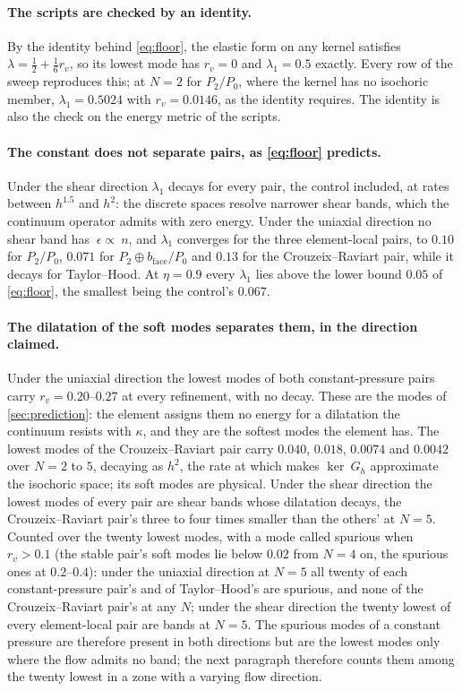 \documentclass{article}
\newcommand{\eps}{~\epsilon}
\theoremstyle{definition}
\theoremstyle{plain}
\begin{document}
\paragraph{The scripts are checked by an identity.} By the identity behind
\eqref{eq:floor}, the elastic form on any kernel satisfies
$\lambda = \tfrac12 + \tfrac16 r_v$, so its lowest mode has $r_v = 0$ and
$\lambda_1 = 0.5$ exactly. Every row of the sweep reproduces this; at $N = 2$
for $P_2/P_0$, where the kernel has no isochoric member, $\lambda_1 = 0.5024$
with $r_v = 0.0146$, as the identity requires. The identity is also the check
on the energy metric of the scripts.

\paragraph{The constant does not separate pairs, as \eqref{eq:floor}
predicts.} Under the shear direction $\lambda_1$ decays for every pair, the
control included, at rates between $h^{1.5}$ and $h^2$: the discrete spaces
resolve narrower shear bands, which the continuum operator admits with zero energy.
Under the uniaxial direction no shear band has $\eps \propto ~n$, and
$\lambda_1$ converges for the three element-local pairs, to $0.10$ for
$P_2/P_0$, $0.071$ for $P_2 \oplus b_{\mathrm{face}}/P_0$ and $0.13$ for the
Crouzeix--Raviart pair, while it decays for Taylor--Hood. At $\eta = 0.9$
every $\lambda_1$ lies above the lower bound $0.05$ of \eqref{eq:floor}, the smallest being the
control's $0.067$.

\paragraph{The dilatation of the soft modes separates them, in the direction
claimed.} Under the uniaxial direction the lowest modes of both
constant-pressure pairs carry $r_v = 0.20$--$0.27$ at every refinement, with
no decay. These are the modes of \cref{sec:prediction}: the element assigns
them no energy for a dilatation the continuum resists with $\kappa$, and they
are the softest modes the element has. The lowest modes of the
Crouzeix--Raviart pair carry $0.040$, $0.018$, $0.0074$ and $0.0042$ over
$N = 2$ to $5$, decaying as $h^2$, the rate at which
\textcite[Prop.~5.1.3]{BoffiBrezziFortin:2013} makes $\ker ~G_h$ approximate the
isochoric space; its soft modes are physical. Under the shear direction the
lowest modes of every pair are shear bands whose dilatation decays, the
Crouzeix--Raviart pair's three to four times smaller than the others' at
$N = 5$. Counted over the twenty lowest modes, with a mode called spurious when
$r_v > 0.1$ (the stable pair's soft modes lie below $0.02$ from $N = 4$ on,
the spurious ones at $0.2$--$0.4$): under the uniaxial direction at $N = 5$
all twenty of each constant-pressure pair's and of Taylor--Hood's are
spurious, and none of the Crouzeix--Raviart pair's at any $N$; under the
shear direction the twenty lowest of every element-local pair are bands at
$N = 5$. The spurious modes of a constant pressure are therefore present in
both directions but are the lowest modes only where the flow admits no band;
the next paragraph therefore counts them among the twenty lowest in a zone
with a varying flow direction.
\end{document}
